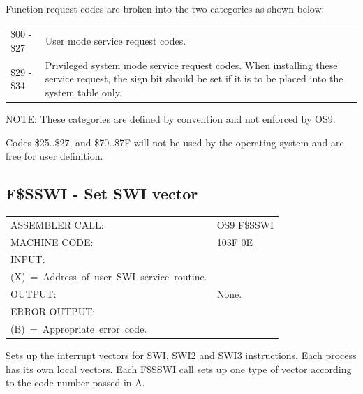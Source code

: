 \documentclass[
]{article}
\newcounter{none} %
\begin{document}
Function request codes are broken into the two categories as shown
below:

{\def\LTcaptype{none} %
\begin{longtable}[]{@{}
  >{\raggedright\arraybackslash}p{}
  >{\raggedright\arraybackslash}p{}@{}}
\toprule\noalign{}
\endhead
\bottomrule\noalign{}
\endlastfoot
\$00 - \$27 & User mode service request codes. \\
\$29 - \$34 & Privileged system mode service request codes. When
installing these service request, the sign bit should be set if it is to
be placed into the system table only. \\
\end{longtable}
}

NOTE: These categories are defined by convention and not enforced by
OS9.

Codes \$25..\$27, and \$70..\$7F will not be used by the operating
system and are free for user definition.

\subsection{F\$SSWI - Set SWI vector}\label{f.sswi}

{\def\LTcaptype{none} %
\begin{longtable}[]{@{}
  >{\raggedright\arraybackslash}p{}
  >{\raggedright\arraybackslash}p{}@{}}
\toprule\noalign{}
\endhead
\bottomrule\noalign{}
\endlastfoot
ASSEMBLER CALL: & OS9 F\$SSWI \\
MACHINE CODE: & 103F 0E \\
INPUT: & \begin{minipage}[t]{\linewidth}\raggedright
(A)~=~SWI~type~code.\\
(X)~=~Address~of~user~SWI~service~routine.
\end{minipage} \\
OUTPUT: & None. \\
ERROR OUTPUT: & \begin{minipage}[t]{\linewidth}\raggedright
(CC)~=~C~bit~set.\\
(B)~=~Appropriate~error~code.
\end{minipage} \\
\end{longtable}
}

Sets up the interrupt vectors for SWI, SWI2 and SWI3 instructions. Each
process has its own local vectors. Each F\$SSWI call sets up one type of
vector according to the code number passed in A.
\end{document}
